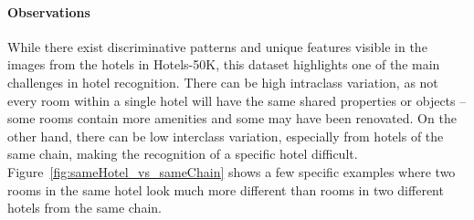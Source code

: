 \paragraph{Observations} While there exist discriminative patterns and unique features visible in the images from the hotels in Hotels-50K, this dataset highlights one of the main challenges in hotel recognition. There can be high intraclass variation, as not every room within a single hotel will have the same shared properties or objects -- some rooms contain more amenities and some may have been renovated. On the other hand, there can be low interclass variation, especially from hotels of the same chain, making the recognition of a specific hotel difficult.  Figure~\ref{fig:sameHotel_vs_sameChain} shows a few specific examples where two rooms in the same hotel look much more different than rooms in two different hotels from the same chain.

